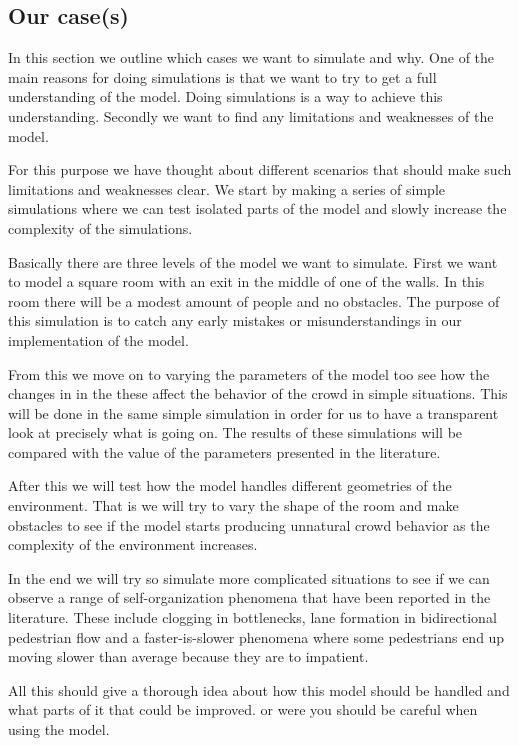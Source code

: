 
\subsection{Our case(s)}
In this section we outline which cases we want to simulate and why.
One of the main reasons for doing simulations is that we want to try to get 
a full understanding of the model. Doing simulations is a way to achieve this
understanding. Secondly we want to find any limitations and weaknesses of the 
model.

For this purpose we have thought about different scenarios that should make such 
limitations and weaknesses clear. We start by making a series of simple simulations
 where we can test isolated parts of the model and slowly increase the complexity 
of the simulations.

Basically there are three levels of the model we want to simulate. First we want to 
model a square room with an exit in the middle of one of the walls. In this 
room there will be a modest amount of people and no obstacles. The purpose of this 
simulation is to catch any early mistakes or misunderstandings in our implementation 
of the model.

From this we move on to varying the parameters of the model too see how the changes in 
in the these affect the behavior of the crowd in simple situations. This will
be done in the same simple simulation in order for us to have a transparent look 
at precisely what is going on. The results of these simulations will be compared 
with the value of the parameters presented in the literature.

After this we will test how the model handles different geometries of the environment. 
That is we will try to vary the shape of the room and make obstacles to see if the 
model starts producing unnatural crowd behavior as the complexity of the environment 
increases. 

In the end we will try so simulate more complicated situations to see if we can observe 
a range of self-organization phenomena that have been reported in the literature. 
These include clogging in bottlenecks, lane formation in bidirectional pedestrian 
flow and a faster-is-slower phenomena where some pedestrians end up moving slower than 
average because they are to impatient.

All this should give a thorough idea about how this model should be handled and what parts 
of it that could be improved. or were you should be careful when using the model.

